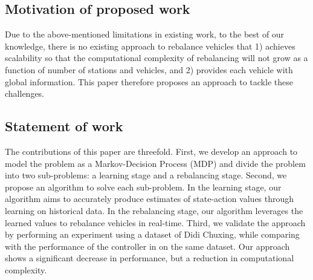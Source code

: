 \documentclass[letterpaper, 10 pt, conference]{ieeeconf}  %
\begin{document}
\subsection{Motivation of proposed work} 
Due to the above-mentioned limitations in existing work, to the best of our knowledge, there is no existing approach to rebalance vehicles that 1) achieves scalability so that the computational complexity of rebalancing will not grow as a function of number of stations and vehicles, and 2) provides each vehicle with global information. This paper therefore proposes an approach to tackle these challenges.  

\subsection{Statement of work} 
The contributions of this paper are threefold. First, we develop an approach to model the problem as a Markov-Decision Process (MDP) and divide the problem into two sub-problems: a learning stage and a rebalancing stage. Second, we propose an algorithm to solve each sub-problem. In the learning stage, our algorithm aims to accurately produce estimates of state-action values through learning on historical data. In the rebalancing stage, our algorithm leverages the learned values to rebalance vehicles in real-time. Third, we validate the approach by performing an experiment using a dataset of Didi Chuxing, while comparing with the performance of the controller in \cite{Zhang.ea:Reactive} on the same dataset. Our approach shows a significant decrease in performance, but a reduction in computational complexity. 
\end{document}
